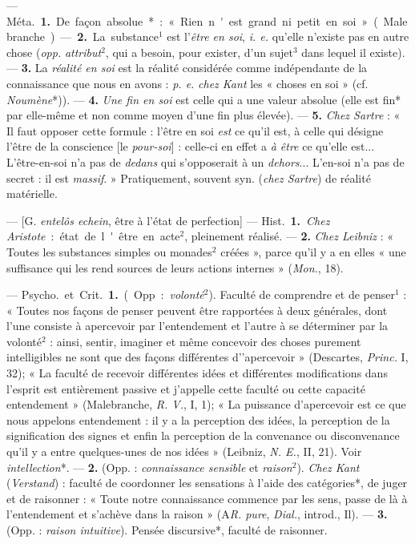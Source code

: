 \begin{itemize}[leftmargin=1cm, label=, itemsep=1pt]
 — \si{Méta.} {\bf 1.} De façon absolue* :
« Rien n'est grand ni petit en soi »
(Malebranche). — {\bf 2.} La substance$^1$
est l'{\it être en soi}, {\it i. e.} qu’elle n'existe
pas en autre chose ({\it opp.} {\it attribut}$^2$,
qui a besoin, pour exister, d’un
sujet$^3$ dans lequel il existe). — {\bf 3.}
La {\it réalité en soi} est la réalité considérée comme indépendante de la
connaissance que nous en avons :
{\it p. e.} {\it chez Kant} les « choses en soi »
(cf. {\it Noumène}*)). — {\bf 4.} {\it Une fin en soi}
est celle qui a une valeur absolue
(elle est fin* par elle-même et non
comme moyen d’une fin plus élevée).
— {\bf 5.} {\it Chez Sartre} : « Il faut opposer
cette formule : l'être en soi {\it est} ce
qu’il est, à celle qui désigne l'être
de la conscience [le {\it pour-soi}] : celle-ci
en effet a {\it à être} ce qu’elle est... L'être-en-soi n’a pas de
{\it dedans} qui s’opposerait à un {\it dehors}... L'en-soi n’a pas
de secret : il est {\it massif}. » Pratiquement, souvent syn.
({\it chez Sartre}) de réalité matérielle.

 — [G. {\it entelôs echein}, être à
l'état de perfection] — \si{Hist.} {\bf 1.}
{\it Chez Aristote} : état de l'être en
acte$^2$, pleinement réalisé. — {\bf 2.} {\it Chez
Leibniz} : « Toutes les substances
simples ou monades$^2$ créées », parce
qu’il y a en elles « une suffisance
qui les rend sources de leurs actions
internes » ({\it Mon.}, 18).

 — \si{Psycho.} et \si{Crit.} {\bf 1.}
(Opp. : {\it volonté}$^2$). Faculté de comprendre et de penser$^1$ :
« Toutes nos
façons de penser peuvent être rapportées à deux générales, dont l’une
consiste à apercevoir par l’entendement et l’autre à se déterminer par
la volonté$^2$ : ainsi, sentir, imaginer
et même concevoir des choses purement intelligibles ne sont que des
façons différentes d’'apercevoir »
(Descartes, {\it Princ.} I, 32); « La
faculté de recevoir différentes idées
et différentes modifications dans
l'esprit est entièrement passive et
j'appelle cette faculté ou cette capacité entendement » (Malebranche,
{\it R. V.}, I, 1); « La puissance d’apercevoir est ce que nous appelons
entendement : il y a la perception
des idées, la perception de la signification des signes et enfin la perception de la convenance ou disconvenance qu'il y a entre quelques-unes de nos idées » (Leibniz, {\it N. E.},
II, 21). Voir {\it intellection}*. — {\bf 2.}
(Opp. : {\it connaissance sensible} et
{\it raison}$^2$). {\it Chez Kant} ({\it Verstand}) :
faculté de coordonner les sensations à l’aide des catégories*, de
juger et de raisonner : « Toute notre
connaissance commence par les sens,
passe de là à l’entendement et
s'achève dans la raison » (A{\it R. pure},
{\it Dial.}, introd., Il). — {\bf 3.} (Opp. :
{\it raison intuitive}). Pensée discursive*,
faculté de raisonner.


\end{itemize}
